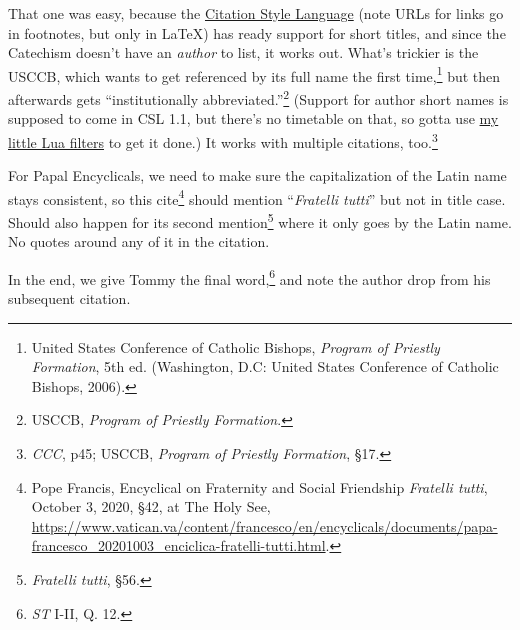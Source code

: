 \documentclass[
    12pt,
    letterpaper,
    oneside,
    noraggedright
]{turabian-researchpaper}
\begin{document}
That one was easy, because the
\href{https://citationstyles.org/}{Citation Style Language} (note URLs
for links go in footnotes, but only in LaTeX) has ready support for
short titles, and since the Catechism doesn't have an \emph{author} to
list, it works out. What's trickier is the USCCB, which wants to get
referenced by its full name the first time,\footnote{United States
  Conference of Catholic Bishops, \emph{Program of Priestly Formation},
  5th ed. (Washington, D.C: United States Conference of Catholic
  Bishops, 2006).} but then afterwards gets ``institutionally
abbreviated.''\footnote{USCCB, \emph{Program of Priestly Formation}.}
(Support for author short names is supposed to come in CSL 1.1, but
there's no timetable on that, so gotta use
\href{https://github.com/sjml/paper/tree/main/paper/resources/project_template/.paper_resources/filters}{my
little Lua filters} to get it done.) It works with multiple citations,
too.\footnote{\emph{CCC}, p45; USCCB, \emph{Program of Priestly
  Formation}, §17.}

For Papal Encyclicals, we need to make sure the capitalization of the
Latin name stays consistent, so this cite\footnote{Pope Francis,
  {Encyclical on Fraternity and Social Friendship \emph{Fratelli
  tutti},} October 3, 2020, §42, at The Holy See,
  \url{https://www.vatican.va/content/francesco/en/encyclicals/documents/papa-francesco_20201003_enciclica-fratelli-tutti.html}.}
should mention ``\emph{Fratelli tutti}'' but not in title case. Should
also happen for its second mention\footnote{{\emph{Fratelli tutti},}
  §56.} where it only goes by the Latin name. No quotes around any of it
in the citation.

In the end, we give Tommy the final word,\footnote{\emph{ST} I-II, Q.
  12.} and note the author drop from his subsequent citation.
\end{document}
